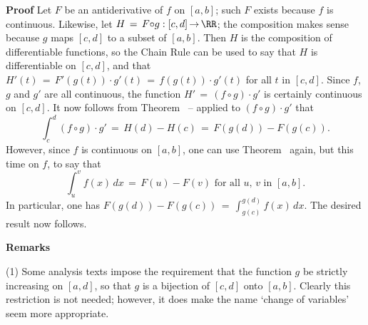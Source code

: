 \V

        {\bf Proof} Let $F$ be an antiderivative of $f$ on $[a,b]$; such $F$ exists because $f$ is continuous.
    Likewise, let $H \,=\, F{\circ}g:[c,d] \,{\rightarrow}\, {\RR}$; the composition makes sense because $g$ maps $[c,d]$ to a subset of $[a,b]$.
    Then $H$ is the composition of differentiable functions, so the Chain Rule can be used to say that $H$ is differentiable on $[c,d]$, and that $H'(t) \,=\, F'(g(t)){\cdot}g'(t) \,=\, f(g(t)){\cdot}g'(t)$ for all $t$ in $[c,d]$.
    Since $f$, $g$ and $g'$ are all continuous, the function $H' \,=\, (f{\circ}g){\cdot}g'$ is certainly continuous on $[c,d]$.
    It now follows from Theorem~ -- applied to $(f{\circ}g){\cdot}g'$ that
        \begin{displaymath}
        \int_{c}^{d} (f{\circ}g){\cdot}g' \,=\, H(d) - H(c) \,=\, F(g(d)) - F(g(c)).
        \end{displaymath}
    However, since $f$ is continuous on $[a,b]$, one can use Theorem~ again, but this time on $f$, to say that
        \begin{displaymath}
        \int_{u}^{v} f(x)\,dx \,=\, F(u) - F(v) \mbox{ for all $u$, $v$ in $[a,b]$}.
        \end{displaymath}
    In particular, one has $F(g(d)) - F(g(c)) \,=\, {\displaystyle \int_{g(c)}^{g(d)} f(x)\,dx}$.
    The desired result now follows.

\V

        {\bf Remarks}

\V

        (1) Some analysis texts impose the requirement that the function $g$ be strictly increasing on $[a,d]$, so that $g$ is a bijection of $[c,d]$ onto $[a,b]$.
    Clearly this restriction is not needed; however, it does make the name `change of variables' seem more appropriate.

\V

